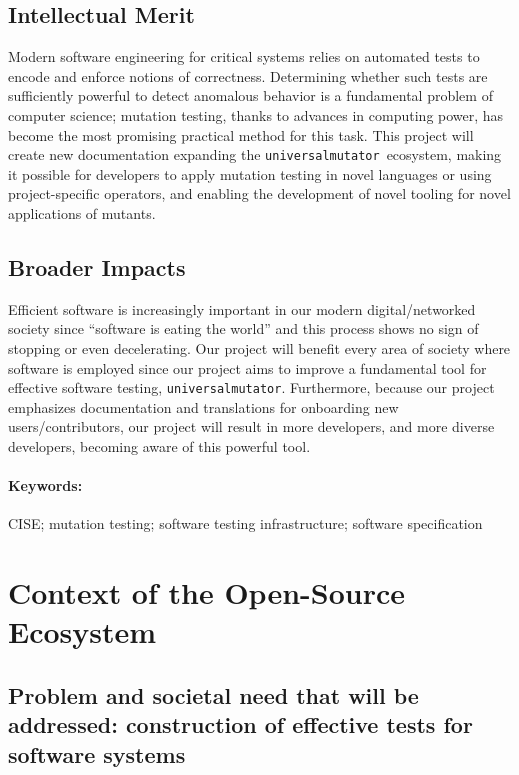 \documentclass[numbers]{proposalnsf}
\newcommand{\um}{\texttt{universalmutator}}
\begin{document}
\subsection*{Intellectual Merit} 
\vspace{-2mm}
Modern software engineering for critical systems relies on automated tests to encode and enforce notions of correctness.  Determining whether such tests are sufficiently powerful to detect anomalous behavior is a fundamental problem of computer science; mutation testing, thanks to advances in computing power, has become the most promising practical method for this task.  This project will create new documentation expanding the \um\ ecosystem, making it possible for developers to apply mutation testing in novel languages or using project-specific operators, and enabling the development of novel tooling for novel applications of mutants.
\subsection*{Broader Impacts}
\vspace{-2mm}

Efficient software is increasingly important in our modern digital/networked society since ``software is eating the world'' and this process shows no sign of stopping or even decelerating. 
Our project will benefit every area of society where software is employed since our project aims to improve a fundamental tool for effective software testing, \um.
Furthermore, because our project emphasizes documentation and translations for onboarding new users/contributors, our project will result in more developers, and more diverse developers, becoming aware of this powerful tool.

\paragraph{Keywords:}
CISE; mutation testing; software testing infrastructure; software specification

\newpage  
\section{Context of the Open-Source Ecosystem}%

\subsection{Problem and societal need that will be addressed: construction of effective tests for software systems}
\end{document}
